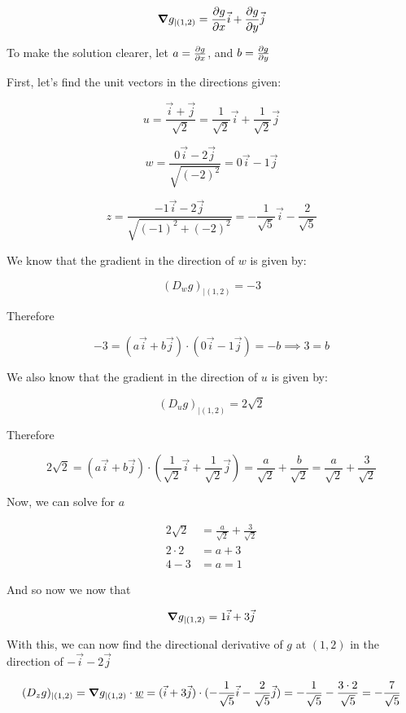 \documentclass[12pt]{article} %
\begin{document}
\begin{homeworkProblem}

    $$
        \gradient g_{\mid (1, 2)} = \pderiv{g}{x} \vec{i} + \pderiv{g}{y} \vec{j}
    $$

    To make the solution clearer, let $a = \frac{\partial g}{\partial x}$, and $b = \frac{\partial g}{\partial y}$

    First, let's find the unit vectors in the directions given:

    $$
        u = \frac{\vec{i} + \vec{j}}{\sqrt{2}} = \frac{1}{\sqrt{2}} \vec{i} + \frac{1}{\sqrt{2}} \vec{j}
    $$

    $$
        w = \frac{0 \vec{i} - 2 \vec{j}}{\sqrt{(-2)^2}} = 0 \vec{i} - 1 \vec{j}
    $$

    $$
        z = \frac{- 1\vec{i} - 2 \vec{j}}{\sqrt{(-1)^2 + (-2)^2}} = - \frac{1}{\sqrt{5}} \vec{i} - \frac{2}{\sqrt{5}}
    $$

    We know that the gradient in the direction of $w$ is given by:

    $$
        (D_w g)_{\mid (1, 2)} = -3
    $$

    Therefore

    $$
        -3
        = (a \vec{i} + b \vec{j}) \cdot (0\vec{i} - 1 \vec{j})
        = -b
        \implies 3 = b
    $$

    We also know that the gradient in the direction of $u$ is given by:

    $$
        (D_u g)_{\mid (1, 2)} = 2 \sqrt{2}
    $$

    Therefore

    $$
        2 \sqrt{2}
        = (a \vec{i} + b \vec{j}) \cdot (\frac{1}{\sqrt{2}} \vec{i} + \frac{1}{\sqrt{2}} \vec{j})
        = \frac{a}{\sqrt{2}} + \frac{b}{\sqrt{2}}
        = \frac{a}{\sqrt{2}} + \frac{3}{\sqrt{2}}
    $$

    Now, we can solve for $a$

    \begin{align*}
        2 \sqrt{2} & = \frac{a}{\sqrt{2}} + \frac{3}{\sqrt{2}} \\
        2 \cdot 2  & = a + 3                                   \\
        4 - 3      & = a = 1
    \end{align*}

    And so now we now that

    $$
        \gradient g_{\mid (1, 2)} = 1 \vec{i} + 3 \vec{j}
    $$

    With this, we can now find the directional derivative of $g$ at $(1, 2)$ in the direction of $-\vec{i} - 2\vec{j}$


    $$
        (D_z g)_{\mid (1, 2)} = \gradient g_{\mid (1, 2)} \cdot \underline{w} = (\vec{i} + 3 \vec{j}) \cdot (- \frac{1}{\sqrt{5}} \vec{i} - \frac{2}{\sqrt{5}} \vec{j}) = - \frac{1}{\sqrt{5}} - \frac{3 \cdot 2}{\sqrt{5}} = - \frac{7}{\sqrt{5}}
    $$
\end{homeworkProblem}
\end{document}
